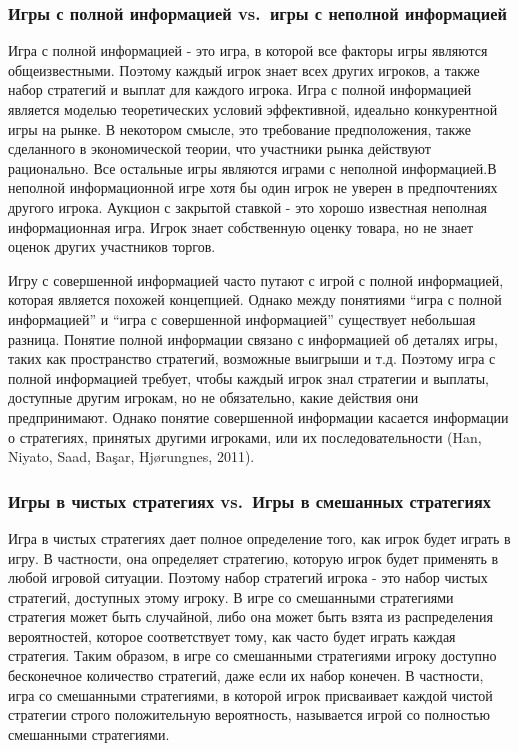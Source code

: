 \subsubsection{Игры с полной информацией vs.~игры с неполной информацией}

Игра с полной информацией - это игра, в которой все факторы игры
являются общеизвестными. Поэтому каждый игрок знает всех других игроков,
а также набор стратегий и выплат для каждого игрока. Игра с полной
информацией является моделью теоретических условий эффективной, идеально
конкурентной игры на рынке. В некотором смысле, это требование
предположения, также сделанного в экономической теории, что участники
рынка действуют рационально. Все остальные игры являются играми с
неполной информацией.В неполной информационной игре хотя бы один игрок
не уверен в предпочтениях другого игрока. Аукцион с закрытой ставкой -
это хорошо известная неполная информационная игра. Игрок знает
собственную оценку товара, но не знает оценок других участников торгов.

Игру с совершенной информацией часто путают с игрой с полной
информацией, которая является похожей концепцией. Однако между понятиями
``игра с полной информацией'' и ``игра с совершенной информацией''
существует небольшая разница. Понятие полной информации связано с
информацией об деталях игры, таких как пространство стратегий, возможные
выигрыши и т.д. Поэтому игра с полной информацией требует, чтобы каждый
игрок знал стратегии и выплаты, доступные другим игрокам, но не
обязательно, какие действия они предпринимают. Однако понятие
совершенной информации касается информации о стратегиях, принятых
другими игроками, или их последовательности (Han, Niyato, Saad, Başar,
Hjørungnes, 2011).

\subsubsection{Игры в чистых стратегиях vs.~Игры в смешанных
стратегиях}

Игра в чистых стратегиях дает полное определение того, как игрок будет
играть в игру. В частности, она определяет стратегию, которую игрок
будет применять в любой игровой ситуации. Поэтому набор стратегий игрока
- это набор чистых стратегий, доступных этому игроку. В игре со
смешанными стратегиями стратегия может быть случайной, либо она может
быть взята из распределения вероятностей, которое соответствует тому,
как часто будет играть каждая стратегия. Таким образом, в игре со
смешанными стратегиями игроку доступно бесконечное количество стратегий,
даже если их набор конечен. В частности, игра со смешанными стратегиями,
в которой игрок присваивает каждой чистой стратегии строго положительную
вероятность, называется игрой со полностью смешанными стратегиями.

